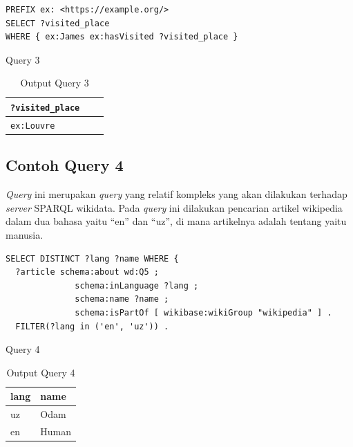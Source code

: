 \begin{listing}[H]
  \begin{verbatim}
PREFIX ex: <https://example.org/>
SELECT ?visited_place
WHERE { ex:James ex:hasVisited ?visited_place }
  \end{verbatim}
  \caption{Query 3}
  \label{lst:query-3}
\end{listing}

\begin{table}
  \centering
  \begin{tabular}{|l|l|l|} \hline
    \texttt{?visited\_place} \\ \hline \hline
    \texttt{ex:Louvre}       \\ \hline
  \end{tabular}
  \caption{Output Query 3}
  \label{tab:output-query-3}
\end{table}

\subsection{Contoh Query 4}
\label{sec:contoh-query-4}

\textit{Query} ini merupakan \textit{query} yang relatif kompleks yang akan dilakukan terhadap
\textit{server} SPARQL wikidata. Pada \textit{query} ini dilakukan pencarian artikel wikipedia dalam
dua bahasa yaitu ``en'' dan ``uz'', di mana artikelnya adalah tentang  yaitu manusia.

\begin{listing}[H]
  \begin{verbatim}
SELECT DISTINCT ?lang ?name WHERE {
  ?article schema:about wd:Q5 ;
              schema:inLanguage ?lang ;
              schema:name ?name ;
              schema:isPartOf [ wikibase:wikiGroup "wikipedia" ] .
  FILTER(?lang in ('en', 'uz')) .
  \end{verbatim}
  \caption{Query 4}
  \label{lst:query-4}
\end{listing}

\begin{table}
  \centering
  \begin{tabular}{|l|l|} \hline
    lang & name \\ \hline \hline
    uz & Odam \\ \hline
    en & Human \\ \hline
  \end{tabular}
  \caption{Output Query 4}
  \label{tab:output-query-4}
\end{table}

